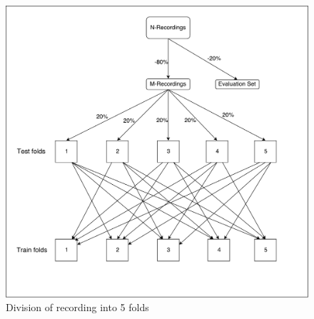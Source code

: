\begin{figure}[h!]
\includegraphics[width=15cm,left,keepaspectratio]{figures/data_division}
\caption{Division of recording into 5 folds}
\label{fig:division_into_5_folds}
\end{figure}

